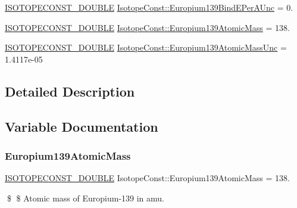 \begin{DoxyCompactItemize}
\mbox{\hyperlink{group___isotope_const-_macros_ga8f45a7272ce02c0b4c65c44636ed719a}{I\+S\+O\+T\+O\+P\+E\+C\+O\+N\+S\+T\+\_\+\+D\+O\+U\+B\+LE}} \mbox{\hyperlink{group___isotope_const-_europium-_eu139_ga5e7fd606450bb92d3938d4361c744830}{Isotope\+Const\+::\+Europium139\+Bind\+E\+Per\+A\+Unc}} = 0.
\item 
\mbox{\hyperlink{group___isotope_const-_macros_ga8f45a7272ce02c0b4c65c44636ed719a}{I\+S\+O\+T\+O\+P\+E\+C\+O\+N\+S\+T\+\_\+\+D\+O\+U\+B\+LE}} \mbox{\hyperlink{group___isotope_const-_europium-_eu139_ga0e6113e46d99823c95f50a366c1a0636}{Isotope\+Const\+::\+Europium139\+Atomic\+Mass}} = 138.
\item 
\mbox{\hyperlink{group___isotope_const-_macros_ga8f45a7272ce02c0b4c65c44636ed719a}{I\+S\+O\+T\+O\+P\+E\+C\+O\+N\+S\+T\+\_\+\+D\+O\+U\+B\+LE}} \mbox{\hyperlink{group___isotope_const-_europium-_eu139_ga3855ba8c0dedf7e08af0ae19cc248d95}{Isotope\+Const\+::\+Europium139\+Atomic\+Mass\+Unc}} = 1.\+4117e-\/05
\end{DoxyCompactItemize}


\subsection{Detailed Description}


\subsection{Variable Documentation}
\mbox{\label{group___isotope_const-_europium-_eu139_ga0e6113e46d99823c95f50a366c1a0636}} 
\subsubsection{\texorpdfstring{Europium139\+Atomic\+Mass}{Europium139AtomicMass}}
{\footnotesize\ttfamily \mbox{\hyperlink{group___isotope_const-_macros_ga8f45a7272ce02c0b4c65c44636ed719a}{I\+S\+O\+T\+O\+P\+E\+C\+O\+N\+S\+T\+\_\+\+D\+O\+U\+B\+LE}} Isotope\+Const\+::\+Europium139\+Atomic\+Mass = 138.}

\$ \$ Atomic mass of Europium-\/139 in amu. \mbox{\label{group___isotope_const-_europium-_eu139_ga3855ba8c0dedf7e08af0ae19cc248d95}} 
